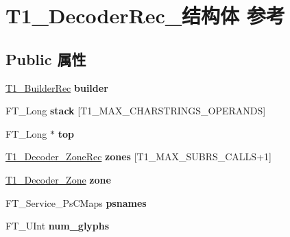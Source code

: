 \hypertarget{struct_t1___decoder_rec__}{}\section{T1\+\_\+\+Decoder\+Rec\+\_\+结构体 参考}
\label{struct_t1___decoder_rec__}
\subsection*{Public 属性}
\begin{DoxyCompactItemize}
\item 
\mbox{\label{struct_t1___decoder_rec___a75fd9f539974efe45107ce602dc9ea1b}} 
\hyperlink{struct_t1___builder_rec__}{T1\+\_\+\+Builder\+Rec} {\bfseries builder}
\item 
\mbox{\label{struct_t1___decoder_rec___af0def194d1b8f9b68f1750820a19bb3f}} 
F\+T\+\_\+\+Long {\bfseries stack} \mbox{[}T1\+\_\+\+M\+A\+X\+\_\+\+C\+H\+A\+R\+S\+T\+R\+I\+N\+G\+S\+\_\+\+O\+P\+E\+R\+A\+N\+DS\mbox{]}
\item 
\mbox{\label{struct_t1___decoder_rec___a5f26aa85b1859f23427b7aba9008f126}} 
F\+T\+\_\+\+Long $\ast$ {\bfseries top}
\item 
\mbox{\label{struct_t1___decoder_rec___a4e33201df5beec8a3d81eca726b09ea5}} 
\hyperlink{struct_t1___decoder___zone_rec__}{T1\+\_\+\+Decoder\+\_\+\+Zone\+Rec} {\bfseries zones} \mbox{[}T1\+\_\+\+M\+A\+X\+\_\+\+S\+U\+B\+R\+S\+\_\+\+C\+A\+L\+LS+1\mbox{]}
\item 
\mbox{\label{struct_t1___decoder_rec___add29399f0c811404b9d6ca373793103e}} 
\hyperlink{struct_t1___decoder___zone_rec__}{T1\+\_\+\+Decoder\+\_\+\+Zone} {\bfseries zone}
\item 
\mbox{\label{struct_t1___decoder_rec___ac1c3efd334618c670c6e2b975829e926}} 
F\+T\+\_\+\+Service\+\_\+\+Ps\+C\+Maps {\bfseries psnames}
\item 
\mbox{\label{struct_t1___decoder_rec___a1ae08137c5931f34db9c3bb864b17712}} 
F\+T\+\_\+\+U\+Int {\bfseries num\+\_\+glyphs}

\end{DoxyCompactItemize}
